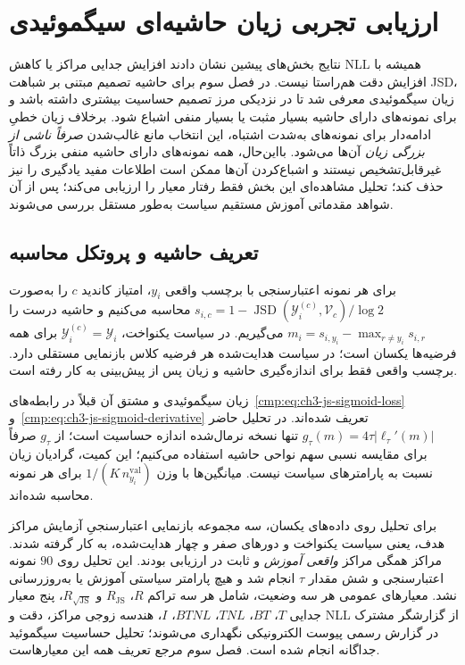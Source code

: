 \section{ارزیابی تجربی زیان حاشیه‌ای سیگموئیدی}
\label{sec:ch4-sigmoid-margin-evaluation}
نتایج بخش‌های پیشین نشان دادند افزایش جدایی مراکز یا کاهش NLL همیشه با افزایش دقت هم‌راستا نیست. در فصل سوم برای حاشیه تصمیم مبتنی بر شباهت JSD، زیان سیگموئیدی معرفی شد تا در نزدیکی مرز تصمیم حساسیت بیشتری داشته باشد و برای نمونه‌های دارای حاشیه بسیار مثبت یا بسیار منفی اشباع شود. برخلاف زیان خطیِ ادامه‌دار برای نمونه‌های به‌شدت اشتباه، این انتخاب مانع غالب‌شدن \emph{صرفاً ناشی از بزرگی زیان} آن‌ها می‌شود. بااین‌حال، همه نمونه‌های دارای حاشیه منفی بزرگ ذاتاً غیرقابل‌تشخیص نیستند و اشباع‌کردن آن‌ها ممکن است اطلاعات مفید یادگیری را نیز حذف کند؛ تحلیل مشاهده‌ای این بخش فقط رفتار معیار را ارزیابی می‌کند؛ پس از آن شواهد مقدماتی آموزش مستقیم سیاست به‌طور مستقل بررسی می‌شوند.

\subsection{تعریف حاشیه و پروتکل محاسبه}
\label{subsec:ch4-sigmoid-protocol}
برای هر نمونه اعتبارسنجی با برچسب واقعی $y_i$، امتیاز کاندید $c$ را به‌صورت
$s_{i,c}=1-\operatorname{JSD}(\mathscr Y_i^{(c)},\mathcal V_c)/\log2$ محاسبه می‌کنیم و حاشیه درست را $m_i=s_{i,y_i}-\max_{r\ne y_i}s_{i,r}$ می‌گیریم. در سیاست یکنواخت، $\mathscr Y_i^{(c)}=\mathscr Y_i$ برای همه فرضیه‌ها یکسان است؛ در سیاست هدایت‌شده هر فرضیه کلاس بازنمایی مستقلی دارد. برچسب واقعی فقط برای اندازه‌گیری حاشیه و زیان پس از پیش‌بینی به کار رفته است.

زیان سیگموئیدی و مشتق آن قبلاً در
رابطه‌های~\eqref{cmp:eq:ch3-js-sigmoid-loss}
و~\eqref{cmp:eq:ch3-js-sigmoid-derivative}
تعریف شده‌اند. در تحلیل حاضر
$g_\tau(m)=4\tau|\ell_\tau'(m)|$
تنها نسخه نرمال‌شده اندازه حساسیت است؛
از $g_\tau$ صرفاً برای مقایسه نسبی سهم نواحی حاشیه استفاده می‌کنیم؛ این کمیت، گرادیان زیان نسبت به پارامترهای سیاست نیست. میانگین‌ها با وزن $1/(K\,n_{y_i}^{\mathrm{val}})$ برای هر نمونه محاسبه شده‌اند.

برای تحلیل روی داده‌های یکسان، سه مجموعه بازنمایی اعتبارسنجیِ آزمایش مراکز هدف، یعنی سیاست یکنواخت و دورهای صفر و چهار هدایت‌شده، به کار گرفته شدند. مراکز همگی مراکز \emph{واقعی آموزش} و ثابت در ارزیابی بودند. این تحلیل روی $90$ نمونه اعتبارسنجی و شش مقدار $\tau$ انجام شد و هیچ پارامتر سیاستی آموزش یا به‌روزرسانی نشد. معیارهای عمومی هر سه وضعیت، شامل هر سه تراکم $R$، $R_{\mathrm{JS}}$ و $R_{\sqrt{\mathrm{JS}}}$، پنج معیار جدایی $T$، $BT$، $TNL$، $BTNL$، $I$، هندسه زوجی مراکز، دقت و NLL از گزارشگر مشترک در گزارش رسمی پیوست الکترونیکی نگهداری می‌شوند؛ تحلیل حساسیت سیگموئید جداگانه انجام شده است. فصل سوم مرجع تعریف همه این معیارهاست.

